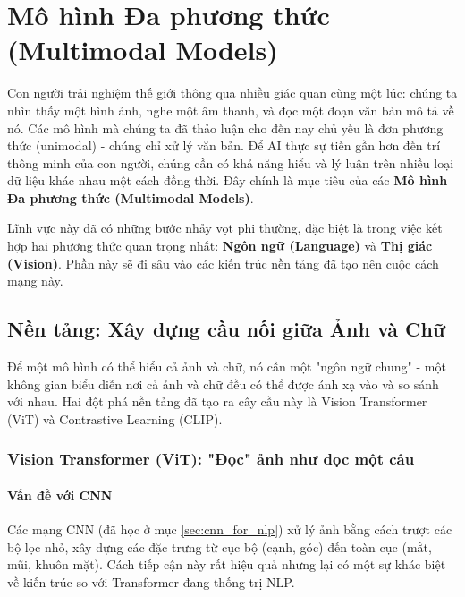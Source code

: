 
\section{Mô hình Đa phương thức (Multimodal Models)}
\label{sec:multimodal_models}

Con người trải nghiệm thế giới thông qua nhiều giác quan cùng một lúc: chúng ta nhìn thấy một hình ảnh, nghe một âm thanh, và đọc một đoạn văn bản mô tả về nó. Các mô hình mà chúng ta đã thảo luận cho đến nay chủ yếu là đơn phương thức (unimodal) - chúng chỉ xử lý văn bản. Để AI thực sự tiến gần hơn đến trí thông minh của con người, chúng cần có khả năng hiểu và lý luận trên nhiều loại dữ liệu khác nhau một cách đồng thời. Đây chính là mục tiêu của các \textbf{Mô hình Đa phương thức (Multimodal Models)}.

Lĩnh vực này đã có những bước nhảy vọt phi thường, đặc biệt là trong việc kết hợp hai phương thức quan trọng nhất: \textbf{Ngôn ngữ (Language)} và \textbf{Thị giác (Vision)}. Phần này sẽ đi sâu vào các kiến trúc nền tảng đã tạo nên cuộc cách mạng này.

\subsection{Nền tảng: Xây dựng cầu nối giữa Ảnh và Chữ}
\label{ssec:multimodal_foundations}

Để một mô hình có thể hiểu cả ảnh và chữ, nó cần một "ngôn ngữ chung" - một không gian biểu diễn nơi cả ảnh và chữ đều có thể được ánh xạ vào và so sánh với nhau. Hai đột phá nền tảng đã tạo ra cây cầu này là Vision Transformer (ViT) và Contrastive Learning (CLIP).

\subsubsection{Vision Transformer (ViT): "Đọc" ảnh như đọc một câu}
\paragraph{Vấn đề với CNN}
Các mạng CNN (đã học ở mục \ref{sec:cnn_for_nlp}) xử lý ảnh bằng cách trượt các bộ lọc nhỏ, xây dựng các đặc trưng từ cục bộ (cạnh, góc) đến toàn cục (mắt, mũi, khuôn mặt). Cách tiếp cận này rất hiệu quả nhưng lại có một sự khác biệt về kiến trúc so với Transformer đang thống trị NLP.

